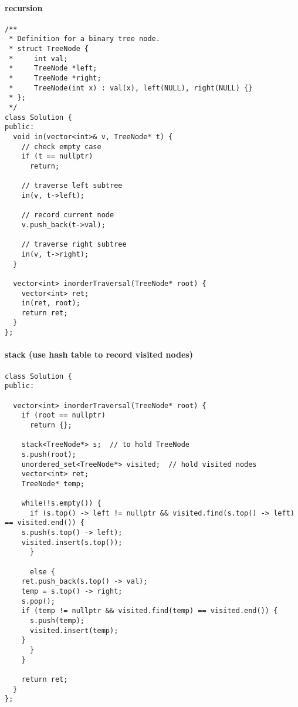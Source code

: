 \documentclass[11pt]{article}
\begin{document}
\paragraph{recursion}
\label{sec:orga39c03b}
\begin{verbatim}
/**
 * Definition for a binary tree node.
 * struct TreeNode {
 *     int val;
 *     TreeNode *left;
 *     TreeNode *right;
 *     TreeNode(int x) : val(x), left(NULL), right(NULL) {}
 * };
 */
class Solution {
public:
  void in(vector<int>& v, TreeNode* t) {
    // check empty case 
    if (t == nullptr)
      return;

    // traverse left subtree
    in(v, t->left);

    // record current node
    v.push_back(t->val);

    // traverse right subtree 
    in(v, t->right);
  }

  vector<int> inorderTraversal(TreeNode* root) {
    vector<int> ret;
    in(ret, root);
    return ret;
  }
};
\end{verbatim}
\paragraph{stack (use hash table to record visited nodes)}
\label{sec:org742cb64}
\begin{verbatim}
class Solution {
public:

  vector<int> inorderTraversal(TreeNode* root) {
    if (root == nullptr)
      return {};

    stack<TreeNode*> s;  // to hold TreeNode
    s.push(root);
    unordered_set<TreeNode*> visited;  // hold visited nodes
    vector<int> ret;
    TreeNode* temp;

    while(!s.empty()) {
      if (s.top() -> left != nullptr && visited.find(s.top() -> left) == visited.end()) {
	s.push(s.top() -> left);
	visited.insert(s.top());
      }

      else {
	ret.push_back(s.top() -> val);
	temp = s.top() -> right;
	s.pop();
	if (temp != nullptr && visited.find(temp) == visited.end()) {
	  s.push(temp);
	  visited.insert(temp);
	}
      }
    }

    return ret;
  }
};
\end{verbatim}
\end{document}
